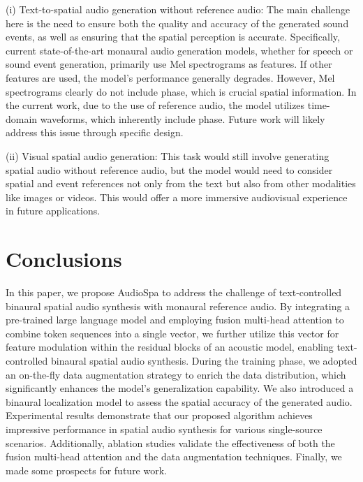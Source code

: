 \documentclass{IEEEtran}
\begin{document}
(i) Text-to-spatial audio generation without reference audio: The main challenge here is the need to ensure both the quality and accuracy of the generated sound events, as well as ensuring that the spatial perception is accurate. Specifically, current state-of-the-art monaural audio generation models, whether for speech or sound event generation, primarily use Mel spectrograms as features. If other features are used, the model's performance generally degrades. However, Mel spectrograms clearly do not include phase, which is crucial spatial information. In the current work, due to the use of reference audio, the model utilizes time-domain waveforms, which inherently include phase. Future work will likely address this issue through specific design.

(ii) Visual spatial audio generation: This task would still involve generating spatial audio without reference audio, but the model would need to consider spatial and event references not only from the text but also from other modalities like images or videos. This would offer a more immersive audiovisual experience in future applications.



\section{Conclusions}    \label{sec:con}
In this paper, we propose AudioSpa to address the challenge of text-controlled binaural spatial audio synthesis with monaural reference audio. By integrating a pre-trained large language model and employing fusion multi-head attention to combine token sequences into a single vector, we further utilize this vector for feature modulation within the residual blocks of an acoustic model, enabling text-controlled binaural spatial audio synthesis. During the training phase, we adopted an on-the-fly data augmentation strategy to enrich the data distribution, which significantly enhances the model's generalization capability. We also introduced a binaural localization model to assess the spatial accuracy of the generated audio. Experimental results demonstrate that our proposed algorithm achieves impressive performance in spatial audio synthesis for various single-source scenarios. Additionally, ablation studies validate the effectiveness of both the fusion multi-head attention and the data augmentation techniques. Finally, we made some prospects for future work.

\small


\end{document}
